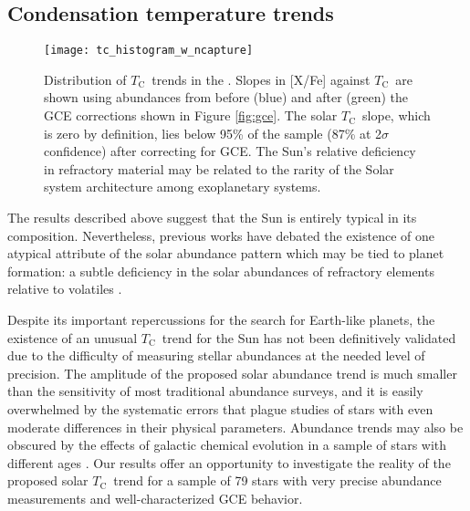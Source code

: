 \documentclass[twocolumn, trackchanges]{aastex62}
\newcommand{\tc}{$T_\mathrm{C}$}
\newcommand{\acronym}[1]{{\small{#1}}}
\begin{document}
\vspace{5mm}

\subsection{Condensation temperature trends}

\begin{figure}
\centering
\texttt{[image: tc\_histogram\_w\_ncapture]}
\caption{Distribution of \tc\ trends in the . Slopes in [X/Fe] against \tc\ are shown using abundances from before (blue) and after (green) the \acronym{GCE} corrections shown in Figure \ref{fig:gce}. The solar \tc\ slope, which is zero by definition, lies below 95\% of the sample (87\% at 2$\sigma$ confidence) after correcting for \acronym{GCE}. The Sun's relative deficiency in refractory material may be related to the rarity of the Solar system architecture among exoplanetary systems.}
\label{fig:tchist}
\end{figure}

The results described above suggest that the Sun is entirely typical in its composition. Nevertheless, previous works have debated the existence of one atypical attribute of the solar abundance pattern which may be tied to planet formation: a subtle deficiency in the solar abundances of refractory elements relative to volatiles \citep{melendez09, ramirez09, adibekyan14, nissen15}. 

Despite its important repercussions for the search for Earth-like planets, the existence of an unusual \tc\ trend for the Sun has not been definitively validated due to the difficulty of measuring stellar abundances at the needed level of precision.
The amplitude of the proposed solar abundance trend is much smaller than the sensitivity of most traditional abundance surveys, and it is easily overwhelmed by the systematic errors that plague studies of stars with even moderate differences in their physical parameters.
Abundance trends may also be obscured by the effects of galactic chemical evolution in a sample of stars with different ages \citep{adibekyan14, nissen15, spina16}. 
Our results offer an opportunity to investigate the reality of the proposed solar \tc\ trend for a sample of 79 stars with very precise abundance measurements and well-characterized \acronym{GCE} behavior.
\end{document}
